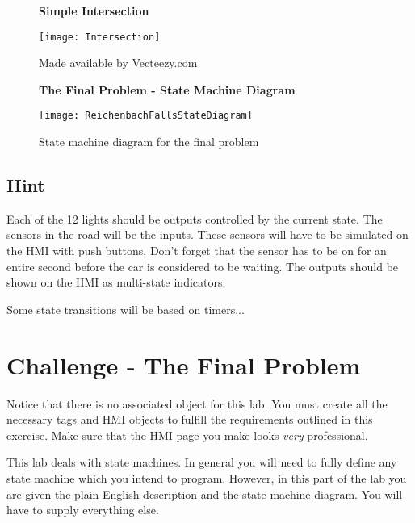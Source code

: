 \begin{figure}[h]
\centering
\textbf{Simple Intersection}\par 
\texttt{[image: Intersection]}
\caption{Made available by Vecteezy.com}
\label{fig:Intersection}
\end{figure}


\begin{figure*}[t]
\centering
\textbf{The Final Problem - State Machine Diagram}\par
\texttt{[image: ReichenbachFallsStateDiagram]}
\caption{State machine diagram for the final problem}
\label{fig:FinalProblemStateMachine}
\end{figure*}


\subsection{Hint}

Each of the 12 lights should be outputs controlled by the current state. The sensors in the road will be the inputs. These sensors will have to be simulated on the HMI with push buttons. Don't forget that the sensor has to be on for an entire second before the car is considered to be waiting. The outputs should be shown on the HMI as multi-state indicators. 

Some state transitions will be based on timers...

\TASignatureSlot



\section{Challenge - The Final Problem}
Notice that there is no associated object for this lab. You must create all the necessary tags and HMI objects to fulfill the requirements outlined in this exercise. Make sure that the HMI page you make looks \textit{very} professional. 

This lab deals with state machines. In general you will need to fully define any state machine which you intend to program. However, in this part of the lab you are given the plain English description and the state machine diagram. You will have to supply everything else.

